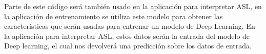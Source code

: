 \documentclass[../main.tex]{subfiles}
\begin{document}
Parte de este código será también usado en la aplicación para interpretar ASL, en la aplicación de entrenamiento se utiliza este modelo para obtener las características que serán usadas para entrenar un modelo de Deep Learning. En la aplicación para interpretar ASL, estos datos serán la entrada  del modelo de Deep learning, el cual nos devolverá una predicción sobre los datos de entrada.
\end{document}
